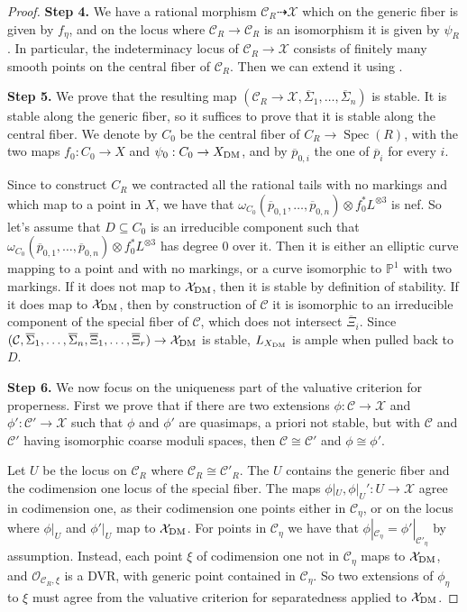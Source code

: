 \documentclass{amsart}
\newcommand{\bP}{\mathbb{P}}
\newcommand{\sC}{\mathscr{C}}
\newcommand{\cC}{\mathcal{C}}
\newcommand{\cO}{\mathcal{O}}
\newcommand{\cX}{\mathcal{X}}
\newcommand{\spec}{\operatorname{Spec}}
\newcommand{\dm}{{\rm DM}}
\theoremstyle{definition}
\theoremstyle{definition}
\begin{document}
{\begin{proof}
    \textbf{Step 4.} We have a rational morphism $\sC_R\dashrightarrow \cX$ which on the generic fiber is given by $f_\eta$, and on the locus where $\cC_R\to \sC_R$ is an isomorphism it is given by $\psi_R$. In particular, the indeterminacy locus of $\sC_R\to \cX$ consists of finitely many smooth points on the central fiber of $\sC_R$. Then we can extend it using .

    \textbf{Step 5.} We prove that the resulting map $(\sC_R\to \cX, \overline{\Sigma}_1,\ldots ,\overline{\Sigma}_n)$ is stable. It is stable along the generic fiber, so it suffices to prove that it is stable along the central fiber. We denote by $C_0$ be the central fiber of $C_R\to \spec(R)$, with the two maps $f_0:C_0\to X$ and $\psi_0:C_0\to X_\dm$, and by $\overline{p}_{0,i}$ the one of $\overline{p}_i$ for every $i$. 

    Since to construct $C_R$ we contracted all the rational tails with no markings and which map to a point in $X$, we have that $\omega_{C_0}( \overline{p}_{0,1},\ldots,\overline{p}_{0,n})\otimes f_0^*L^{\otimes 3}$ is nef. So let's assume that $D\subseteq C_0$ is an irreducible component such that $\omega_{C_0}( \overline{p}_{0,1},\ldots,\overline{p}_{0,n})\otimes f_0^*L^{\otimes 3}$ has degree 0 over it. Then it is either an elliptic curve mapping to a point and with no markings, or a curve isomorphic to $\bP^1$ with two markings. If it does not map to $\cX_\dm$, then it is stable by definition of stability.
    If it does map to $\cX_\dm$, then by construction of $\cC$ it is isomorphic to an irreducible component of the special fiber of $\cC$, which does not intersect $\overline{\Xi}_i$. Since $(\cC,\overline{\Sigma}_1,\ldots,\overline{\Sigma}_n, \overline{\Xi}_1,\ldots,\overline{\Xi}_r)\to \cX_\dm$ is stable, $L_{X_\dm}$ is ample when pulled back to $D$. 

    \textbf{Step 6.} We now focus on the uniqueness part of the valuative criterion for properness. First we prove that if there are two extensions $\phi:\sC\to \cX$ and $\phi':\sC'\to \cX$ such that $\phi$ and $\phi'$ are quasimaps, a priori not stable, but with $\sC$ and $ \sC'$ having isomorphic coarse moduli spaces, then $\sC\cong \sC'$ and $\phi\cong \phi'$. 

    Let $U$ be the locus on $\sC_R$ where $\sC_R\cong \sC'_R$. The $U$ contains the generic fiber and the codimension one locus of the special fiber. The maps $\phi|_U, \phi|_U':U\to \cX$ agree in codimension one, as their codimension one points either in $\sC_\eta$, or on the locus where $\phi|_U$ and $\phi'|_U$ map to $\cX_\dm$. For points in $\sC_\eta$ we have that $\phi|_{\sC_\eta} = \phi'|_{\sC'_\eta}$ by assumption. Instead, each point $\xi$ of codimension one not in $\sC_\eta$ maps to $\cX_\dm$, and $\cO_{\sC_R,\xi}$ is a DVR, with generic point contained in $\sC_\eta$. So two extensions of $\phi_\eta$ to $\xi$ must agree from the valuative criterion for separatedness applied to $\cX_\dm$.
    

\end{proof}}
\end{document}
